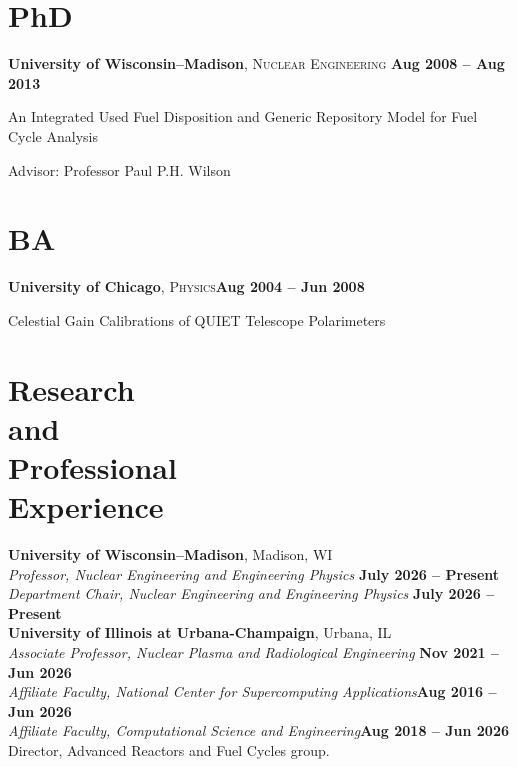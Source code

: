 \documentclass[margin,line]{resume}
\begin{document}
\begin{resume}
    \section{\mysidestyle PhD}
    \textbf{University of Wisconsin--Madison}, \textsc{Nuclear Engineering}\hfill \textbf{ Aug 2008 -- Aug 2013}\vspace{-3mm}\\\vspace{-1mm}%
    \begin{list2}
        \item An Integrated Used Fuel Disposition and Generic Repository Model for Fuel Cycle Analysis
        \item Advisor:  Professor Paul P.H. Wilson
    \end{list2}\vspace{-1.5mm}
    \section{\mysidestyle BA}
    \textbf{University of Chicago}, \textsc{Physics}\hfill\textbf{Aug 2004 -- Jun 2008}\vspace{-3mm}\\\vspace{-1mm}%
    \begin{list2}
        \item Celestial Gain Calibrations of QUIET Telescope Polarimeters
    \end{list2}\vspace{-1.5mm}
    \section{\mysidestyle Research\\and\\Professional\\Experience}
    
    \textbf{University of Wisconsin--Madison}, Madison, WI\\
                \textsl{Professor, Nuclear Engineering and Engineering Physics} \hfill \textbf{July 2026 -- Present}\\
                \textsl{Department Chair, Nuclear Engineering and Engineering Physics} \hfill \textbf{July 2026 -- Present}\\

    \textbf{University of Illinois at Urbana-Champaign}, Urbana, IL\\
                \textsl{Associate Professor, Nuclear Plasma and Radiological Engineering} \hfill \textbf{Nov 2021 -- Jun 2026}\\
                \textsl{Affiliate Faculty, National Center for Supercomputing Applications}\hfill \textbf{Aug 2016 -- Jun 2026}\\
                \textsl{Affiliate Faculty, Computational Science and Engineering}\hfill \textbf{Aug 2018 -- Jun 2026}\\
                Director, Advanced Reactors and Fuel Cycles group.
    

\end{resume}
\end{document}
